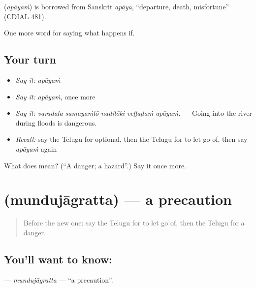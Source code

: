 \begin{cousinweb}
\textbf{} (\emph{apāyaṁ}) is borrowed from Sanskrit \emph{apāya}, \textquotedblleft{}departure, death, misfortune\textquotedblright{} (CDIAL 481).
\end{cousinweb}

\begin{grammarlens}[title={What you've built}]
One more word for saying what happens if.
\end{grammarlens}

\subsection*{Your turn}
\begin{itemize}
\raggedright
  \item \emph{Say it:} \emph{apāyaṁ}
  \item \emph{Say it:} \emph{apāyaṁ}, once more
  \item \emph{Say it:} \emph{varadala samayaṁlō nadilōki veḷḷaḍaṁ apāyaṁ.} — Going into the river during floods is dangerous.
  \item \emph{Recall:} say the Telugu for optional, then the Telugu for to let go of, then say \emph{apāyaṁ} again
\end{itemize}

\begin{tcolorbox}[breakable,colback=teal!4,colframe=teal!35!black,title={Before you move on}]
What does  mean? (\textquotedblleft{}A danger; a hazard\textquotedblright{}.) Say it once more.
\end{tcolorbox}
\section[\texorpdfstring{\te{ముందుజాగ్రత్త} (mundujāgratta)}{ముందుజాగ్రత్త (mundujāgratta)}]{ (mundujāgratta) — a precaution}

\label{lesson:TE-C421-mundujagratta}



\begin{quote}
Before the new one: say the Telugu for to let go of, then the Telugu for a danger.
\end{quote}

\subsection*{You'll want to know: }
\textbf{} — \emph{mundujāgratta} — \textquotedblleft{}a precaution\textquotedblright{}.

